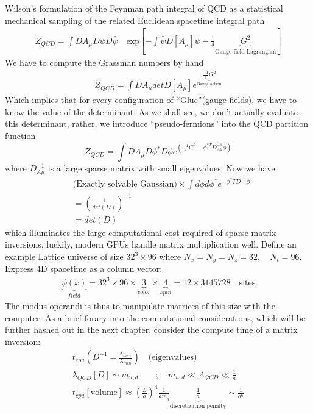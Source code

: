 Wilson's formulation of the Feynman path integral of QCD as a statistical mechanical sampling of the related Euclidean spacetime integral path 
\begin{align}
    Z_{QCD} = \int DA_\mu D\psi D\bar{\psi} \quad \text{exp}\left[-\int \bar{\psi}D[A_\mu]\psi - \frac{1}{4}\underbrace{G^2}_{\text{Gauge field Lagrangian}}\right]
\end{align}
We have to compute the Grassman numbers by hand 
\begin{align}
    Z_{QCD} = \int DA_\mu det D[A_\mu]e^{\underbrace{\frac{-1}{4}G^2}_{\text{Gauge action}}}
\end{align}
Which implies that for every configuration of ``Glue''(gauge fields), we have to know the value of the determinant. As we shall see, we don't actually evaluate this determinant, rather, we introduce ``pseudo-fermions'' into the QCD partition function 
\begin{equation}
    Z_{QCD} = \int DA_\mu D\phi^* D\phi e^{\left(\frac{-1}{4}G^2 - \phi^{*T}D_{A\mu}^{-1}\phi\right)}
\end{equation} where $D_{A\mu}^{-1}$ is a large sparse matrix with small eigenvalues. Now we have 
\begin{align}
    & \text{(Exactly solvable Gaussian)} \times \int d\phi d\phi^* e^{-\phi^*T D^{-1}\phi} \\ 
    &= \left(\frac{1}{det(D)}\right)^{-1} \\
    &= det(D)
\end{align}
which illuminates the large computational cost required of sparse matrix inversions, luckily, modern GPUs handle matrix multiplication well. Define an example Lattice universe of size $32^3 \times 96$ where $N_x=N_y=N_z = 32, \quad N_t=96$. Express 4D spacetime as a column vector: 
\begin{align}
   \underbrace{\psi(x)}_{field} = 32^3 \times 96 \times \underbrace{3}_{color} \times \underbrace{4}_{spin} = 12 \times 3145728 \quad \text{sites} 
\end{align}
The modus operandi is thus to manipulate matrices of this size with the computer. 
As a brief forary into the computational considerations, which will be further hashed out in the next chapter, consider the compute time of a matrix inversion: 
\begin{align}
    t_{cpu}\left(D^{-1} = \frac{\lambda_{max}}{\lambda_{min}}\right) \quad \text{(eigenvalues)} \\ 
    \lambda_{QCD}[D] \sim m_{u,d} \qquad ;\quad  m_{u,d} \ll \Lambda_{QCD} \ll \frac{1}{a} \\
    t_{cpu}[\text{volume}] \approx \left(\frac{L}{a}\right)^4 \frac{1}{am_q} \underbrace{\frac{1}{a}}_{\text{discretization penalty}} \sim \frac{1}{a^6}
\end{align}  
